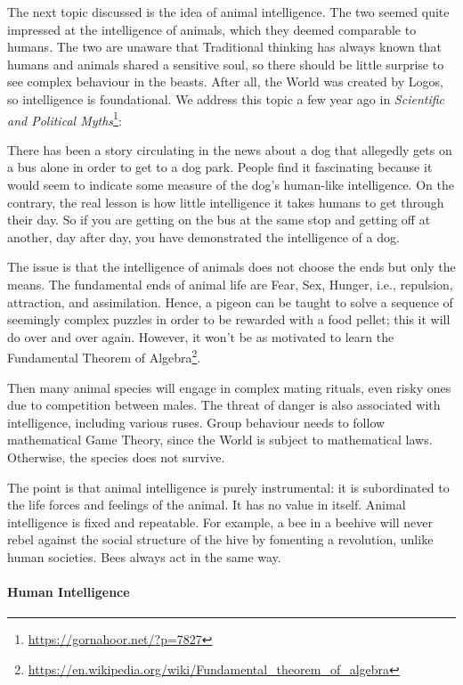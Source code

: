 The next topic discussed is the idea of animal intelligence. The two seemed quite impressed at the intelligence of animals, which they deemed comparable to humans. The two are unaware that Traditional thinking has always known that humans and animals shared a sensitive soul, so there should be little surprise to see complex behaviour in the beasts. After all, the World was created by Logos, so intelligence is foundational. We address this topic a few year ago in \textit{Scientific and Political Myths}\footnote{\url{https://gornahoor.net/?p=7827}}:

\begin{quotex}
There has been a story circulating in the news about a dog that allegedly gets on a bus alone in order to get to a dog park. People find it fascinating because it would seem to indicate some measure of the dog's human-like intelligence. On the contrary, the real lesson is how little intelligence it takes humans to get through their day. So if you are getting on the bus at the same stop and getting off at another, day after day, you have demonstrated the intelligence of a dog.
\end{quotex}


The issue is that the intelligence of animals does not choose the ends but only the means. The fundamental ends of animal life are Fear, Sex, Hunger, i.e., repulsion, attraction, and assimilation. Hence, a pigeon can be taught to solve a sequence of seemingly complex puzzles in order to be rewarded with a food pellet; this it will do over and over again. However, it won't be as motivated to learn the Fundamental Theorem of Algebra\footnote{\url{https://en.wikipedia.org/wiki/Fundamental\_theorem\_of\_algebra}}.

Then many animal species will engage in complex mating rituals, even risky ones due to competition between males. The threat of danger is also associated with intelligence, including various ruses. Group behaviour needs to follow mathematical Game Theory, since the World is subject to mathematical laws. Otherwise, the species does not survive.

The point is that animal intelligence is purely instrumental: it is subordinated to the life forces and feelings of the animal. It has no value in itself. Animal intelligence is fixed and repeatable. For example, a bee in a beehive will never rebel against the social structure of the hive by fomenting a revolution, unlike human societies. Bees always act in the same way.

\paragraph{Human Intelligence}


